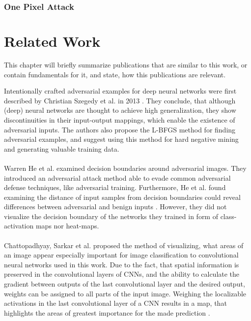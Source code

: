 \documentclass[draft,final]{vutinfth} %
\begin{document}
\subsection{One Pixel Attack}



\chapter{Related Work}

This chapter will briefly summarize publications that are similar to this work, or contain fundamentals for it, and state, how this publications are relevant.

Intentionally crafted adversarial examples for deep neural networks were first described by Christian Szegedy et al. in 2013 \cite{Szegedy2013}.
They conclude, that although (deep) neural networks are thought to achieve high generalization, they show discontinuities in their input-output mappings, which enable the existence of adversarial inputs.
The authors also propose the L-BFGS method for finding adversarial examples, and suggest using this method for hard negative mining and generating valuable training data.\\
\\
Warren He et al. examined decision boundaries around adversarial images.
They introduced an adversarial attack method able to evade common adversarial defense techniques, like adversarial training.
Furthermore, He et al. found examining the distance of input samples from decision boundaries could reveal differences between adversarial and benign inputs \cite{He2018}.
However, they did not visualize the decision boundary of the networks they trained in form of class-activation maps nor heat-maps.\\
\\
Chattopadhyay, Sarkar et al. proposed the method of visualizing, what areas of an image appear especially important for image classification to convolutional neural networks used in this work. 
Due to the fact, that spatial information is preserved in the convolutional layers of CNNs, and the ability to calculate the gradient between outputs of the last convolutional layer and the desired output, weights can be assigned to all parts of the input image.
Weighing the localizable activations in the last convolutional layer of a CNN results in a map, that highlights the areas of greatest importance for the made prediction \cite{Chattopadhyay2017}.\\
\end{document}
